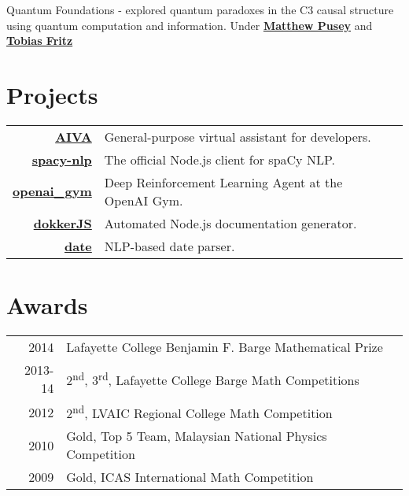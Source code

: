 \documentclass{deedy-resume-openfont}
\begin{document}
\begin{minipage}[t]{0.66\textwidth}
Quantum Foundations - explored quantum paradoxes in the C3 causal structure using quantum computation and information. Under \textbf{\href{https://www.mattpusey.uk/}{Matthew Pusey}} and \textbf{\href{http://perimeterinstitute.ca/personal/tfritz/}{Tobias Fritz}}
\sectionsep


\section{Projects} 
\begin{tabular}{rll}

\href{https://github.com/kengz/aiva}{\bf AIVA}  & General-purpose virtual assistant for developers.\\
\href{https://github.com/kengz/spacy-nlp}{\bf spacy-nlp}  & The official Node.js client for spaCy NLP.\\
\href{https://github.com/kengz/openai_gym}{\bf openai\_gym}  & Deep Reinforcement Learning Agent at the OpenAI Gym.\\
\href{https://github.com/kengz/dokker}{\bf dokkerJS}  &  Automated Node.js documentation generator. \\
\href{https://github.com/matthewmueller/date}{\bf date}  & NLP-based date parser.\\
\end{tabular}
\sectionsep


\section{Awards} 
\begin{tabular}{rll}
2014	     & Lafayette College Benjamin F. Barge Mathematical Prize\\
2013-14	     & 2\textsuperscript{nd}, 3\textsuperscript{rd}, Lafayette College Barge Math Competitions\\
2012	     & 2\textsuperscript{nd}, LVAIC Regional College Math Competition\\
2010     & Gold, Top 5 Team, Malaysian National Physics Competition  \\
2009     & Gold, ICAS International Math Competition \\
\end{tabular}
\sectionsep



\end{minipage}
\end{document}
